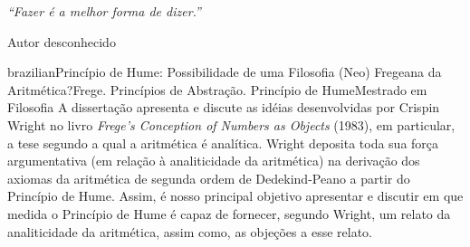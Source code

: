\documentclass[diss]{UFRuralRJ}
\begin{document}



\clearpage\mbox{}\vfill\hspace{80mm}\begin{minipage}{76mm}\begin{flushright}{\em
``Fazer é a melhor forma de dizer.''
\par
Autor desconhecido
}\end{flushright}\end{minipage}

\def\tituloPT{Princípio de Hume: Possibilidade de uma Filosofia (Neo) Fregeana da Aritmética?}
\def\chavesPT{Frege. Princípios de Abstração. Princípio de Hume} %
\def\nivelPT{Mestrado em Filosofia}

\begin{generalabstract}{brazilian}{\tituloPT}{\chavesPT}{\nivelPT} %
  A dissertação apresenta e discute as idéias desenvolvidas por Crispin Wright 
  no livro \textit{Frege’s Conception of Numbers as Objects} (1983), em 
  particular, a tese segundo a qual a aritmética é analítica. Wright deposita 
  toda sua força argumentativa (em relação à analiticidade da aritmética) na 
  derivação dos axiomas da aritmética de segunda ordem de Dedekind-Peano a 
  partir do Princípio de Hume. Assim, é nosso principal objetivo apresentar e 
  discutir em que medida o Princípio de Hume é capaz de fornecer, segundo 
  Wright, um relato da analiticidade da aritmética, assim como, as objeções a 
  esse relato.
\end{generalabstract}

\def\tituloEN{Hume's Principle: Possibility of a (Neo) Fregean Philosophy of Arithmetic?} %
\def\chavesEN{Frege. Abstraction Principles. Hume's Principle} %
\def\nivelEN{Master of Philosophy}
\end{document}
